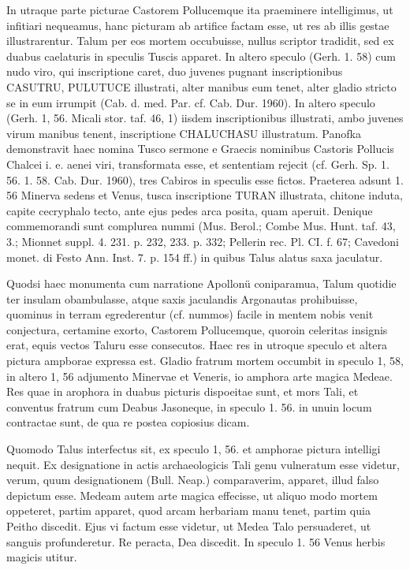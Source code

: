 \documentclass[landscape, a4paper, 11pt, oneside, polutonikogreek, german]{article}
\begin{document}
In utraque parte picturae Castorem Pollucemque ita praeminere intelligimus, ut infitiari nequeamus, hanc picturam ab artifice factam esse, ut res ab illis gestae illustrarentur. Talum per eos mortem occubuisse, nullus scriptor tradidit, sed ex duabus caelaturis in speculis Tuscis apparet. In altero speculo (Gerh. 1. 58) cum nudo viro, qui inscriptione caret, duo juvenes pugnant inscriptionibus CASUTRU, PULUTUCE illustrati, alter manibus eum tenet, alter gladio stricto se in eum irrumpit (Cab. d. med. Par. cf. Cab. Dur. 1960). In altero speculo (Gerh. 1, 56. Micali stor. taf. 46, 1) iisdem inscriptionibus illustrati, ambo juvenes virum manibus tenent, inscriptione CHALUCHASU illustratum. Panofka demonstravit haec nomina Tusco sermone e Graecis nominibus Castoris Pollucis Chalcei i. e. aenei viri, transformata esse, et sententiam rejecit (cf. Gerh. Sp. 1. 56. 1. 58. Cab. Dur. 1960), tres Cabiros in speculis esse fictos. Praeterea adsunt 1. 56 Minerva sedens et Venus, tusca inscriptione TURAN illustrata, chitone induta, capite cecryphalo tecto, ante ejus pedes arca posita, quam aperuit. Denique commemorandi sunt complurea nummi (Mus. Berol.; Combe Mus. Hunt. taf. 43, 3.; Mionnet suppl. 4. 231. p. 232, 233. p. 332; Pellerin rec. Pl. CI. f. 67; Cavedoni monet. di Festo Ann. Inst. 7. p. 154 ff.) in quibus Talus alatus saxa jaculatur.

Quodsi haec monumenta cum narratione Apollonü coniparamua, Talum quotidie ter insulam obambulasse, atque saxis jaculandis Argonautas prohibuisse, quominus in terram egrederentur (cf. nummos) facile in mentem nobis venit conjectura, certamine exorto, Castorem Pollucemque, quoroin celeritas insignis erat, equis vectos Taluru esse consecutos. Haec res in utroque speculo et altera pictura ampborae expressa est. Gladio fratrum mortem occumbit in speculo 1, 58, in altero 1, 56 adjumento Minervae et Veneris, io amphora arte magica Medeae. Res quae in arophora in duabus picturis dispoeitae sunt, et mors Tali, et conventus fratrum cum Deabus Jasoneque, in speculo 1. 56. in unuin locum contractae sunt, de qua re postea copiosius dicam.

Quomodo Talus interfectus sit, ex speculo 1, 56. et amphorae pictura intelligi nequit. Ex designatione in actis archaeologicis Tali genu vulneratum esse videtur, verum, quum designationem (Bull. Neap.) comparaverim, apparet, illud falso depictum esse. Medeam autem arte magica effecisse, ut aliquo modo mortem oppeteret, partim apparet, quod arcam herbariam manu tenet, partim quia Peitho discedit. Ejus vi factum esse videtur, ut Medea Talo persuaderet, ut sanguis profunderetur. Re peracta, Dea discedit. In speculo 1. 56 Venus herbis magicis utitur.
\end{document}
